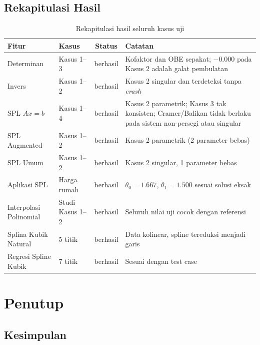 \documentclass[12pt,a4paper]{report}
\begin{document}
\section{Rekapitulasi Hasil}
 
\begin{table}[H]
    \centering
    \caption{Rekapitulasi hasil seluruh kasus uji}
    \begin{tabular}{|l|l|c|p{5.5cm}|}
        \hline
        \textbf{Fitur} & \textbf{Kasus} & \textbf{Status} & \textbf{Catatan} \\
        \hline
        Determinan & Kasus 1--3 & berhasil & Kofaktor dan OBE sepakat; $-0.000$ pada Kasus 2 adalah galat pembulatan \\
        \hline
        Invers & Kasus 1--2 & berhasil & Kasus 2 singular dan terdeteksi tanpa \emph{crash} \\
        \hline
        SPL $Ax=b$ & Kasus 1--4 & berhasil & Kasus 2 parametrik; Kasus 3 tak konsisten; Cramer/Balikan tidak berlaku pada sistem non-persegi atau singular \\
        \hline
        SPL Augmented & Kasus 1--2 & berhasil & Kasus 2 parametrik (2 parameter bebas) \\
        \hline
        SPL Umum & Kasus 1--2 & berhasil & Kasus 2 singular, 1 parameter bebas \\
        \hline
        Aplikasi SPL & Harga rumah & berhasil & $\theta_0=1.667$, $\theta_1=1.500$ sesuai solusi eksak \\
        \hline
        Interpolasi Polinomial & Studi Kasus 1--2 & berhasil & Seluruh nilai uji cocok dengan referensi \\
        \hline
        Splina Kubik Natural & 5 titik & berhasil & Data kolinear, spline tereduksi menjadi garis \\
        \hline
        Regresi Spline Kubik & 7 titik & berhasil & Sesuai dengan test case \\
        \hline
    \end{tabular}
\end{table}



\chapter{Penutup}

\section{Kesimpulan}
\end{document}
